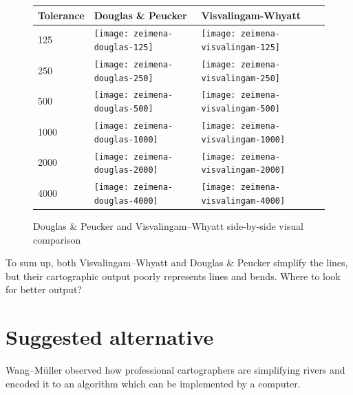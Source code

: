 \documentclass[a4paper]{article}
\newcommand{\DP}{Douglas \& Peucker}
\newcommand{\VW}{Visvalingam--Whyatt}
\newcommand{\WM}{Wang--M{\"u}ller}
\begin{document}
\begin{figure}[H]
    \renewcommand{\tabularxcolumn}[1]{>{\center\small}m{#1}}
    \begin{tabularx}{\textwidth}{ p{1.5cm} | X | X | }
        Tolerance                                                 &
        Douglas \& Peucker                                        &
        Visvalingam-Whyatt                                        \tabularnewline \hline

        125                                                       &
        \texttt{[image: zeimena-douglas-125]}           &
        \texttt{[image: zeimena-visvalingam-125]}       \tabularnewline \hline

        250                                                       &
        \texttt{[image: zeimena-douglas-250]}         &
        \texttt{[image: zeimena-visvalingam-250]}     \tabularnewline \hline

        500                                                       &
        \texttt{[image: zeimena-douglas-500]}        &
        \texttt{[image: zeimena-visvalingam-500]}    \tabularnewline \hline

        1000                                                      &
        \texttt{[image: zeimena-douglas-1000]}      &
        \texttt{[image: zeimena-visvalingam-1000]}  \tabularnewline \hline

        2000                                                      &
        \texttt{[image: zeimena-douglas-2000]}     &
        \texttt{[image: zeimena-visvalingam-2000]} \tabularnewline \hline

        4000                                                      &
        \texttt{[image: zeimena-douglas-4000]}     &
        \texttt{[image: zeimena-visvalingam-4000]} \tabularnewline \hline
    \end{tabularx}
    \caption{{\DP} and {\VW} side-by-side visual comparison}
    \label{tab:dp-vs-vw}
\end{figure}

To sum up, both {\VW} and {\DP} simplify the lines, but their cartographic
output poorly represents lines and bends. Where to look for better output?

\section{Suggested alternative}
\label{sec:suggested_alternative}

{\WM} observed how professional cartographers are simplifying rivers and encoded it
to an algorithm which can be implemented by a computer.
\end{document}
